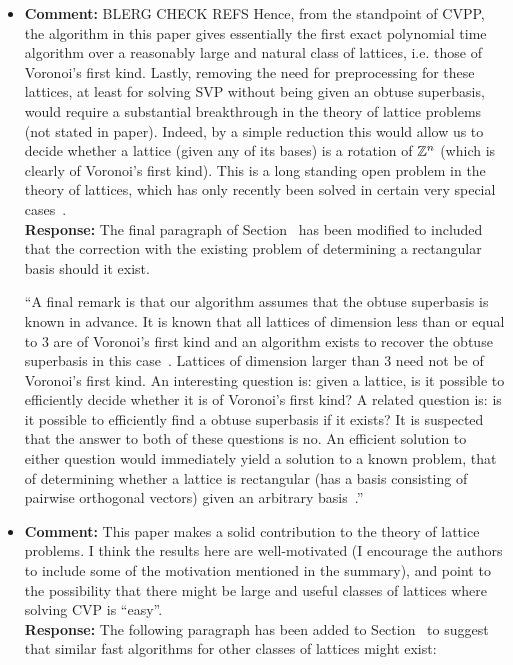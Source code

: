 \documentclass[a4paper,10pt]{article}
\begin{document}
\begin{itemize}
\item\textbf{Comment:} 
BLERG CHECK REFS Hence, from the standpoint of CVPP, the algorithm in this paper gives essentially the first
exact polynomial time algorithm over a reasonably large and natural class of lattices, i.e. those
of Voronoi’s first kind. Lastly, removing the need for preprocessing for these lattices, at least for
solving SVP without being given an obtuse superbasis, would require a substantial breakthrough
in the theory of lattice problems (not stated in paper). Indeed, by a simple reduction this would
allow us to decide whether a lattice (given any of its bases) is a rotation of ${\mathbb Z}^n$ (which is clearly
of Voronoi’s first kind). This is a long standing open problem in the theory of lattices, which has
only recently been solved in certain very special cases~\cite{Lenstra_Silverberg_revisting_gentra_szydlo_2014}.
\\\textbf{Response:}
The final paragraph of Section~ has been modified to included that the correction with the existing problem of determining a rectangular basis should it exist.

``A final remark is that our algorithm assumes that the obtuse superbasis is known in advance.  It is known that all lattices of dimension less than or equal to 3 are of Voronoi's first kind and an algorithm exists to recover the obtuse superbasis in this case~\cite{SPLAG}.  Lattices of dimension larger than 3 need not be of Voronoi's first kind.  An interesting question is: given a lattice, is it possible to efficiently decide whether it is of Voronoi's first kind?  A related question is: is it possible to efficiently find a obtuse superbasis if it exists?  It is suspected that the answer to both of these questions is no.  An efficient solution to either question would immediately yield a solution to a known problem, that of determining whether a lattice is rectangular (has a basis consisting of pairwise orthogonal vectors) given an arbitrary basis~\cite{Lenstra_Silverberg_revisting_gentra_szydlo_2014}.''


\item\textbf{Comment:} 
This paper makes a solid contribution to the theory of lattice problems. I think the results here are
well-motivated (I encourage the authors to include some of the motivation mentioned in the summary), and point to the possibility that there might be large and useful classes of lattices where
solving CVP is “easy”.
\\\textbf{Response:}
The following paragraph has been added to Section~ to suggest that similar fast algorithms for other classes of lattices might exist:


\end{itemize}
\end{document}
